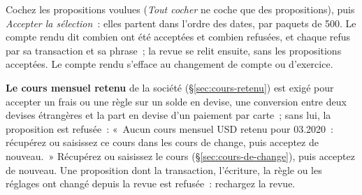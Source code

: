 \documentclass[a4paper,11pt,oneside]{article}
\begin{document}
Cochez les propositions voulues (\emph{Tout cocher} ne coche que des propositions), puis \emph{Accepter la sélection}~: elles partent dans l'ordre des dates, par paquets de 500. Le compte rendu dit combien ont été acceptées et combien refusées, et chaque refus par sa transaction et sa phrase~; la revue se relit ensuite, sans les propositions acceptées. Le compte rendu s'efface au changement de compte ou d'exercice.

\textbf{Le cours mensuel retenu} de la société (\S\ref{sec:cours-retenu}) est exigé pour accepter un frais ou une règle sur un solde en devise, une conversion entre deux devises étrangères et la part en devise d'un paiement par carte~; sans lui, la proposition est refusée~: «~Aucun cours mensuel USD retenu pour 03.2020~: récupérez ou saisissez ce cours dans les cours de change, puis acceptez de nouveau.~» Récupérez ou saisissez le cours (\S\ref{sec:cours-de-change}), puis acceptez de nouveau. Une proposition dont la transaction, l'écriture, la règle ou les réglages ont changé depuis la revue est refusée~: rechargez la revue.
\end{document}
